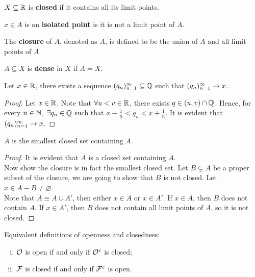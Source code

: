 \documentclass[11pt]{article}
\begin{document}
	\begin{definition}
		$X \subseteq \mathbb{R}$ is \textbf{closed} if it contains all its limit points.
	\end{definition}
	
	\begin{definition}
		$x \in A$ is an \textbf{isolated point} is it is not a limit point of $A$.
	\end{definition}

	\begin{definition}
		The \textbf{closure} of $A$, denoted as $\overline{A}$, is defined to be the union of $A$ and all limit points of $A$.
	\end{definition}

	\begin{definition}
		$A \subseteq X$ is \textbf{dense} in $X$ if $\overline{A} = X$.
	\end{definition}
	
	\begin{theorem}
		Let $x \in \mathbb{R}$, there exists a sequence $({q}_{n})_{{n}=1}^\infty \subseteq \mathbb{Q}$ such that $({q}_{n})_{{n}=1}^\infty \to x$.
	\end{theorem}
	
	\begin{proof}
		Let $x \in \mathbb{R}$. Note that $\forall u < v \in \mathbb{R}$, there exists $q \in (u, v) \cap \mathbb{Q}$.
		Hence, for every $n \in \mathbb{N}$, $\exists q_n \in \mathbb{Q}$ such that $x - \frac{1}{n} < q_n < x + \frac{1}{n}$. It is evident that $({q}_{n})_{{n}=1}^\infty \to x$.
	\end{proof}
	
	\begin{lemma}
		$\overline{A}$ is the smallest closed set containing $A$.
	\end{lemma}
	\begin{proof}
		It is evident that $\overline{A}$ is a closed set containing $A$. \\
		Now show the closure is in fact the smallest closed set. Let $B \subsetneq \overline{A}$ be a proper subset of the closure, we are going to show that $B$ is not closed. Let $x \in \overline{A} - B \neq \varnothing$.\\
		Note that $\overline{A} \equiv A \cup A'$, then either $x \in A$ or $x \in A'$. If $x \in A$, then $B$ does not contain $A$. If $x \in A'$, then $B$ does not contain all limit points of $A$, so it is not closed.
	\end{proof}
	
	\begin{theorem} Equivalent definitions of openness and closedness:
		\begin{enumerate}[(i)]
			\item $\mathcal{{O}}$ is open if and only if $\mathcal{{O}}^c$ is closed;
			\item $\mathcal{{F}}$ is closed if and only if $\mathcal{{F}}^c$ is open.
		\end{enumerate}
	\end{theorem}
	
\end{document}
